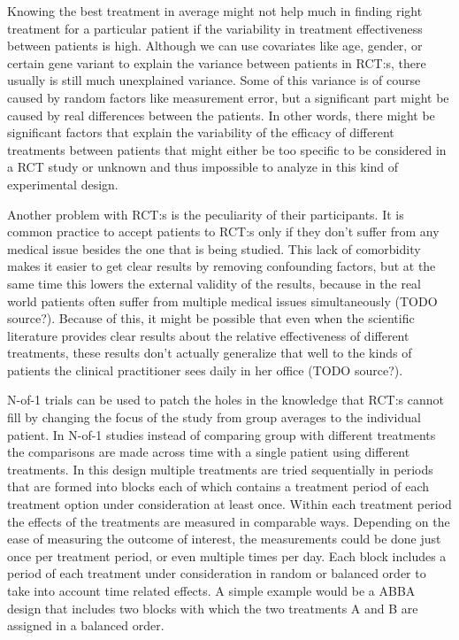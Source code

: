 \documentclass[12pt,a4paper,leqno]{report}
\theoremstyle{plain}
\theoremstyle{definition}
\theoremstyle{remark}
\begin{document}
Knowing the best treatment in average might not help much in finding right
treatment for a particular patient if the variability in treatment
effectiveness between patients is high. Although we can use covariates like
age, gender, or certain gene variant to explain the variance between patients
in RCT:s, there usually is still much unexplained variance. Some of this
variance is of course caused by random factors like measurement error, but a
significant part might be caused by real differences between the
patients. In other words, there might be significant factors that explain the
variability of the efficacy of different treatments between patients that
might either be too specific to be considered in a RCT study or unknown and
thus impossible to analyze in this kind of experimental design.

Another problem with RCT:s is the peculiarity of their participants. It is common
practice to accept patients to RCT:s only if they don't suffer from any
medical issue besides the one that is being studied. This lack of comorbidity
makes it easier to get clear results by removing confounding factors, but at
the same time this lowers the external validity of the results, because in the
real world patients often suffer from multiple medical issues simultaneously (TODO source?).
Because of this, it might be possible that even when the scientific literature
provides clear results about the relative effectiveness of different treatments, these
results don't actually generalize that well to the kinds of patients the clinical
practitioner sees daily in her office (TODO source?).

N-of-1 trials can be used to patch the holes in the knowledge that RCT:s cannot fill by
changing the focus of the study from group averages to the individual patient. In N-of-1
studies instead of comparing group with different treatments the comparisons are made
across time with a single patient using different treatments. In this design
multiple treatments are tried sequentially in periods that are
formed into blocks each of which contains a treatment period of each treatment option
under consideration at least once. Within each treatment period the effects of the
treatments are measured in comparable ways. Depending on the ease of measuring the outcome
of interest, the measurements could be done just once per treatment period,
or even multiple times per day. Each block includes a period of each treatment under
consideration in random or balanced order to take into account time related
effects. A simple example would be a ABBA design that includes two blocks with
which the two treatments A and B are assigned in a balanced order.
\end{document}
